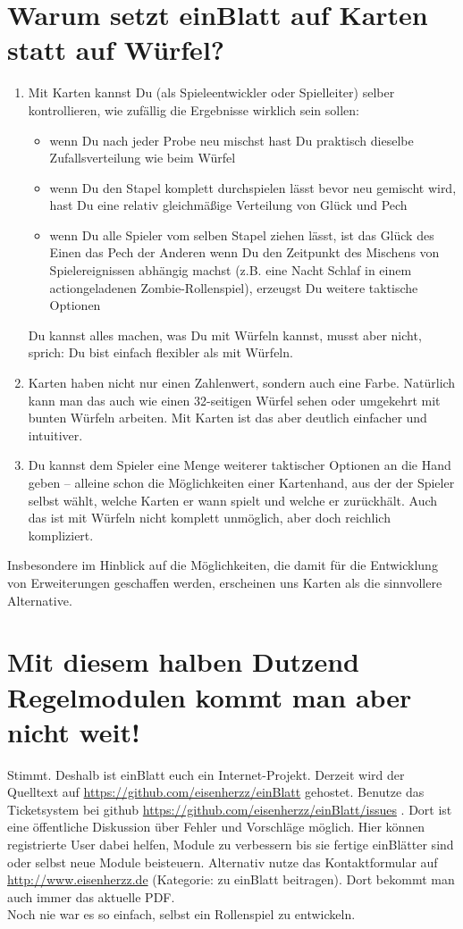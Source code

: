 \section{Warum setzt einBlatt auf Karten statt auf Würfel?}
\begin{enumerate}
\item Mit Karten kannst Du (als Spieleentwickler oder Spielleiter) selber kontrollieren, wie zufällig die Ergebnisse wirklich sein sollen:
\begin{itemize}
\item wenn Du nach jeder Probe neu mischst hast Du praktisch dieselbe Zufallsverteilung wie beim Würfel
\item wenn Du den Stapel komplett durchspielen lässt bevor neu gemischt wird, hast Du eine relativ gleichmäßige Verteilung von Glück und Pech
\item wenn Du alle Spieler vom selben Stapel ziehen lässt, ist das Glück des Einen das Pech der Anderen wenn Du den Zeitpunkt des Mischens von Spielereignissen abhängig machst (z.B. eine Nacht Schlaf in einem actiongeladenen Zombie-Rollenspiel), erzeugst Du weitere taktische Optionen
\end{itemize}      
Du kannst alles machen, was Du mit Würfeln kannst, musst aber nicht, sprich: Du bist einfach flexibler als mit Würfeln.
\item Karten haben nicht nur einen Zahlenwert, sondern auch eine Farbe. Natürlich kann man das auch wie einen 32-seitigen Würfel sehen oder umgekehrt mit bunten Würfeln arbeiten. Mit Karten ist das aber deutlich einfacher und intuitiver.
\item Du kannst dem Spieler eine Menge weiterer taktischer Optionen an die Hand geben -- alleine schon die Möglichkeiten einer Kartenhand, aus der der Spieler selbst wählt, welche Karten er wann spielt und welche er zurückhält. Auch das ist mit Würfeln nicht komplett unmöglich, aber doch reichlich kompliziert.
\end{enumerate}
Insbesondere im Hinblick auf die Möglichkeiten, die damit für die Entwicklung von Erweiterungen geschaffen werden, erscheinen uns Karten als die sinnvollere Alternative.

\section {Mit diesem halben Dutzend Regelmodulen kommt man aber nicht weit!}
Stimmt. Deshalb ist einBlatt euch ein Internet-Projekt. Derzeit wird der Quelltext auf \url{https://github.com/eisenherzz/einBlatt} gehostet. Benutze das Ticketsystem bei github \url{https://github.com/eisenherzz/einBlatt/issues} . Dort ist eine öffentliche Diskussion über Fehler und Vorschläge möglich. Hier können registrierte User dabei helfen, Module zu verbessern bis sie fertige einBlätter sind oder selbst neue Module beisteuern. Alternativ nutze das Kontaktformular auf \url{http://www.eisenherzz.de} (Kategorie: zu einBlatt beitragen). Dort bekommt man auch immer das aktuelle PDF.
\\
Noch nie war es so einfach, selbst ein Rollenspiel zu entwickeln.

